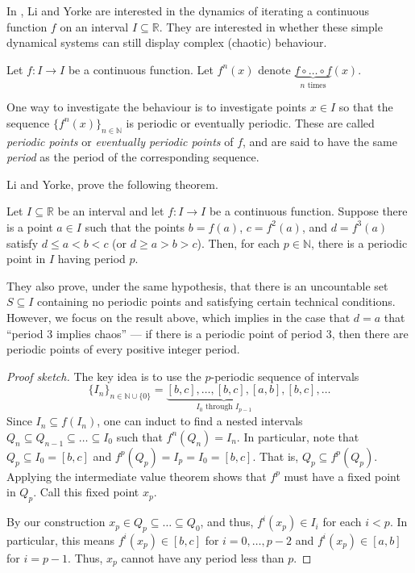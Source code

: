 \documentclass[12 pt, letterpaper]{hmcpset}
\begin{document}
In \cite{period-three}, Li and Yorke are interested in the dynamics of iterating a continuous function $f$ on an interval $I \subseteq \mathbb{R}$. They are interested in whether these simple dynamical systems can still display complex (chaotic) behaviour. 

Let $f : I \to I$ be a continuous function. Let $f^{n}(x)$ denote $\underbrace{f \circ \dots \circ f}_{n \text{ times}}(x)$. 

One way to investigate the behaviour is to investigate points $x \in I$ so that the sequence $\{ f^{n}(x) \}_{n \in \mathbb{N}}$ is periodic or eventually periodic. These are called \emph{periodic points} or \emph{eventually periodic points} of $f$, and are said to have the same \emph{period} as the period of the corresponding sequence.

Li and Yorke, prove the following theorem.

\begin{theorem}
	Let $I \subseteq \mathbb{R}$ be an interval and let $f : I \to I$ be a continuous function. Suppose there is a point $a \in I$ such that the points $b = f(a)$, $c = f^{2}(a)$, and $d = f^{3}(a)$ satisfy $d \le a < b < c$ (or $d \ge a > b > c$). Then, for each $p \in \mathbb{N}$, there is a periodic point in $I$ having period $p$.
\end{theorem}

They also prove, under the same hypothesis, that there is an uncountable set $S \subseteq I$ containing no periodic points and satisfying certain technical conditions. However, we focus on the result above, which implies in the case that $d = a$ that ``period $3$ implies chaos'' --- if there is a periodic point of period $3$, then there are periodic points of every positive integer period.

\begin{proof}[Proof sketch]
The key idea is to use the $p$-periodic sequence of intervals
\[
	\{ I_{n} \}_{n \in \mathbb{N} \cup \{ 0 \}} = \underbrace{[b, c], \dots, [b, c], [a, b]}_{I_{0} \text{ through } I_{p - 1}}, [b, c], \dots
\]
Since $I_{n} \subseteq f(I_{n})$, one can induct to find a nested intervals $Q_{n} \subseteq Q_{n - 1} \subseteq \dots \subseteq I_{0}$ such that $f^{n}(Q_{n}) = I_{n}$. In particular, note that $Q_{p} \subseteq I_{0} = [b, c]$ and $f^{p}(Q_{p}) = I_{p} = I_{0} = [b, c]$. That is, $Q_{p} \subseteq f^{p}(Q_{p})$. Applying the intermediate value theorem shows that $f^{p}$ must have a fixed point in $Q_{p}$. Call this fixed point $x_{p}$.

By our construction $x_{p} \in Q_{p} \subseteq \dots \subseteq Q_{0}$, and thus, $f^{i}(x_{p}) \in I_{i}$ for each $i < p$. In particular, this means $f^{i}(x_{p}) \in [b, c]$ for $i = 0, \dots, p - 2$ and $f^{i}(x_{p}) \in [a, b]$ for $i = p - 1$. Thus, $x_{p}$ cannot have any period less than $p$.

\end{proof}
\end{document}

